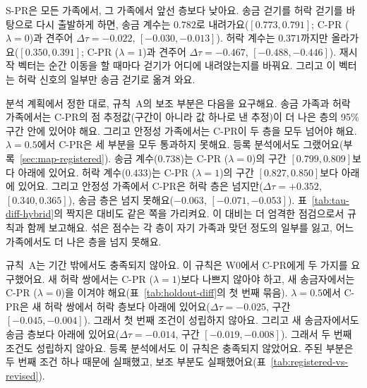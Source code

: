 \mbox{S-PR}은 모든 가족에서, 그 가족에서 앞선 층보다 낮아요. 송금 걷기를 허락 걷기를 바탕으로 다시 출발하게 하면, 송금 계수는 $0.782$로 내려가요($[0.773,0.791]$; \mbox{C-PR} ($\lambda=0$)과 견주어 $\Delta\tau=-0.022$, $[-0.030,-0.013]$). 허락 계수는 $0.371$까지만 올라가요($[0.350,0.391]$; \mbox{C-PR} ($\lambda=1$)과 견주어 $\Delta\tau=-0.467$, $[-0.488,-0.446]$). 재시작 벡터는 순간 이동을 할 때마다 걷기가 어디에 내려앉는지를 바꿔요. 그리고 이 벡터는 허락 신호의 일부만 송금 걷기로 옮겨 와요.

분석 계획에서 정한 대로, 규칙~A의 보조 부분은 다음을 요구해요. 송금 가족과 허락 가족에서는 \mbox{C-PR}의 점 추정값(구간이 아니라 값 하나로 낸 추정)이 더 나은 층의 95\% 구간 안에 있어야 해요. 그리고 안정성 가족에서는 \mbox{C-PR}이 두 층을 모두 넘어야 해요. $\lambda=0.5$에서 \mbox{C-PR}은 세 부분을 모두 통과하지 못해요. 등록 분석에서도 그랬어요(부록~\ref{sec:map-registered}). 송금 계수($0.738$)는 \mbox{C-PR} ($\lambda=0$)의 구간 $[0.799,0.809]$보다 아래에 있어요. 허락 계수($0.433$)는 \mbox{C-PR} ($\lambda=1$)의 구간 $[0.827,0.850]$보다 아래에 있어요. 그리고 안정성 가족에서 \mbox{C-PR}은 허락 층은 넘지만($\Delta\tau=+0.352$, $[0.340,0.365]$), 송금 층은 넘지 못해요($-0.063$, $[-0.071,-0.053]$). 표~\ref{tab:tau-diff-hybrid}의 짝지은 대비도 같은 쪽을 가리켜요. 이 대비는 더 엄격한 점검으로서 규칙과 함께 보고해요. 섞은 점수는 각 층이 자기 가족과 맞던 정도의 일부를 잃고, 어느 가족에서도 더 나은 층을 넘지 못해요.


규칙~A는 기간 밖에서도 충족되지 않아요. 이 규칙은 W0에서 \mbox{C-PR}에게 두 가지를 요구했어요. 새 허락 쌍에서는 \mbox{C-PR} ($\lambda=1$)보다 나쁘지 않아야 하고, 새 송금자에서는 \mbox{C-PR} ($\lambda=0$)을 이겨야 해요(표~\ref{tab:holdout-diff}의 첫 번째 묶음). $\lambda=0.5$에서 \mbox{C-PR}은 새 허락 쌍에서 허락 층보다 아래에 있어요($\Delta\tau=-0.025$, 구간 $[-0.045,-0.004]$). 그래서 첫 번째 조건이 성립하지 않아요. 그리고 새 송금자에서도 송금 층보다 아래에 있어요($\Delta\tau=-0.014$, 구간 $[-0.019,-0.008]$). 그래서 두 번째 조건도 성립하지 않아요. 등록 분석에서도 이 규칙은 충족되지 않았어요. 주된 부분은 두 번째 조건 하나 때문에 실패했고, 보조 부분도 실패했어요(표~\ref{tab:registered-vs-revised}).

